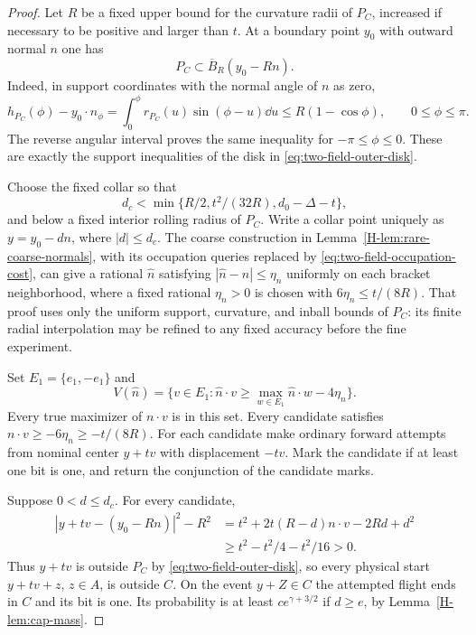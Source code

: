 \begin{proof}
Let $R$ be a fixed upper bound for the curvature radii of $P_C$,
increased if necessary to be positive and larger than $t$.
At a boundary point $y_0$ with outward normal $n$ one has
\begin{equation}\label{eq:two-field-outer-disk}
                 P_C\subset\overline B_R(y_0-Rn).
\end{equation}
Indeed, in support coordinates with the normal angle of $n$ as zero,
\[
 h_{P_C}(\phi)-y_0\cdot n_\phi
   =\int_0^\phi r_{P_C}(u)\sin(\phi-u)\dd u
   \le R(1-\cos\phi),\qquad 0\le\phi\le\pi.
\]
The reverse angular interval proves the same inequality for
$-\pi\le\phi\le0$.  These are exactly the support inequalities
of the disk in \eqref{eq:two-field-outer-disk}.

Choose the fixed collar so that
\[
 d_c<\min\{R/2,t^2/(32R),d_0-\Delta-t\},
\]
and below a fixed interior rolling radius of $P_C$.
Write a collar point uniquely as $y=y_0-dn$, where $|d|\le d_c$.
The coarse construction in Lemma~\ref{H-lem:rare-coarse-normals}, with
its occupation queries replaced by \eqref{eq:two-field-occupation-cost},
can give a rational $\widehat n$ satisfying
$|\widehat n-n|\le\eta_n$ uniformly on each bracket neighborhood,
where a fixed rational $\eta_n>0$ is chosen with
$6\eta_n\le t/(8R)$.  That proof uses only the uniform support,
curvature, and inball bounds of $P_C$: its finite radial interpolation
may be refined to any fixed accuracy before the fine experiment.

Set $E_1=\{e_1,-e_1\}$ and
\[
 V(\widehat n)=\{v\in E_1:\widehat n\cdot v
                  \ge\max_{w\in E_1}\widehat n\cdot w-4\eta_n\}.
\]
Every true maximizer of $n\cdot v$ is in this set.  Every candidate
satisfies $n\cdot v\ge-6\eta_n\ge-t/(8R)$.
For each candidate make ordinary forward attempts from nominal center
$y+tv$ with displacement $-tv$.  Mark the candidate if at least one
bit is one, and return the conjunction of the candidate marks.

Suppose $0<d\le d_c$.  For every candidate,
\begin{align*}
 |y+tv-(y_0-Rn)|^2-R^2
 &=t^2+2t(R-d)n\cdot v-2Rd+d^2\\
 &\ge t^2-t^2/4-t^2/16>0.
\end{align*}
Thus $y+tv$ is outside $P_C$ by
\eqref{eq:two-field-outer-disk}, so every physical start
$y+tv+z$, $z\in A$, is outside $C$.  On the event $y+Z\in C$
the attempted flight ends in $C$ and its bit is one.  Its probability
is at least $c e^{\gamma+3/2}$ if $d\ge e$, by
Lemma~\ref{H-lem:cap-mass}.


\end{proof}
